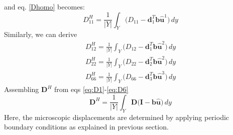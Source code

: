 \documentclass[openright,twoside]{iitkthesis}
\newcommand{\e}[1]{\textbf{#1}}
\begin{document}
and eq. \eqref{Dhomo} becomes:
\begin{equation}
\label{eq:D1}
\boxed{D^H_{11} = \frac{1}{|Y|}\int_Y\bigg (D_{11}-\textbf{d}_1^T\textbf{b}\hat{\e u}^1\bigg )\,dy
}
\end{equation}
Similarly, we can derive
\begin{eqnarray}
D^H_{12} = \frac{1}{|Y|}\int_Y\bigg (D_{12}-\textbf{d}_1^T\textbf{b}\hat{\e u}^2\bigg )\,dy\\
D^H_{22} = \frac{1}{|Y|}\int_Y\bigg (D_{22}-\textbf{d}_2^T\textbf{b}\hat{\e u}^2\bigg )\,dy\\
\label{eq:D6}
D^H_{66} = \frac{1}{|Y|}\int_Y\bigg (D_{66}-\textbf{d}_3^T\textbf{b}\hat{\e u}^3\bigg )\,dy
\end{eqnarray}
Assembling $\e D^H$ from eqs \eqref{eq:D1}-\eqref{eq:D6}
\begin{equation}
\label{eq:dehomogenized2}
\boxed{\e D^H = \frac{1}{|Y|}\int_Y\e D\big (\e I-\textbf{b}\hat{\e u}\big)\,dy}
\end{equation}
Here, the microscopic displacements are determined by applying periodic boundary conditions as explained in previous section.
\end{document}
